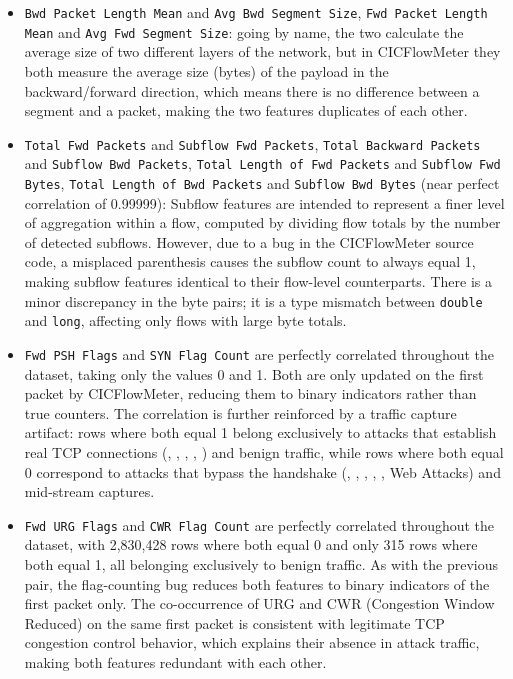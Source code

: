 \begin{itemize}
    \item \texttt{Bwd Packet Length Mean} and \texttt{Avg Bwd Segment Size}, \texttt{Fwd Packet Length Mean} and \texttt{Avg Fwd Segment Size}: going by name, the two calculate the average size of two different layers of the network, but in CICFlowMeter they both measure the average size (bytes) of the payload in the backward/forward direction, which means there is no difference between a segment and a packet, making the two features duplicates of each other.

    \item \texttt{Total Fwd Packets} and \texttt{Subflow Fwd Packets}, \texttt{Total Backward Packets} and \texttt{Subflow Bwd Packets}, \texttt{Total Length of Fwd Packets} and \texttt{Subflow Fwd Bytes}, \texttt{Total Length of Bwd Packets} and \texttt{Subflow Bwd Bytes} (near perfect correlation of 0.99999): Subflow features are intended to represent a finer level of aggregation within a flow, computed by dividing flow totals by the number of detected subflows. However, due to a bug in the CICFlowMeter source code, a misplaced parenthesis causes the subflow count to always equal 1, making subflow features identical to their flow-level counterparts. There is a minor discrepancy in the byte pairs; it is a type mismatch between \texttt{double} and \texttt{long}, affecting only flows with large byte totals.

    \item \texttt{Fwd PSH Flags} and \texttt{SYN Flag Count} are perfectly correlated throughout the dataset, taking only the values 0 and 1. Both are only updated on the first packet by CICFlowMeter, reducing them to binary indicators rather than true counters. The correlation is further reinforced by a traffic capture artifact: rows where both equal 1 belong exclusively to attacks that establish real TCP connections (\texttt{}, \texttt{}, \texttt{}, \texttt{}, \texttt{}) and benign traffic, while rows where both equal 0 correspond to attacks that bypass the handshake (\texttt{}, \texttt{}, \texttt{}, \texttt{}, \texttt{}, Web Attacks) and mid-stream captures.

    \item \texttt{Fwd URG Flags} and \texttt{CWR Flag Count} are perfectly correlated throughout the dataset, with 2,830,428 rows where both equal 0 and only 315 rows where both equal 1, all belonging exclusively to benign traffic. As with the previous pair, the flag-counting bug reduces both features to binary indicators of the first packet only. The co-occurrence of URG and CWR (Congestion Window Reduced) on the same first packet is consistent with legitimate TCP congestion control behavior, which explains their absence in attack traffic, making both features redundant with each other.


\end{itemize}
